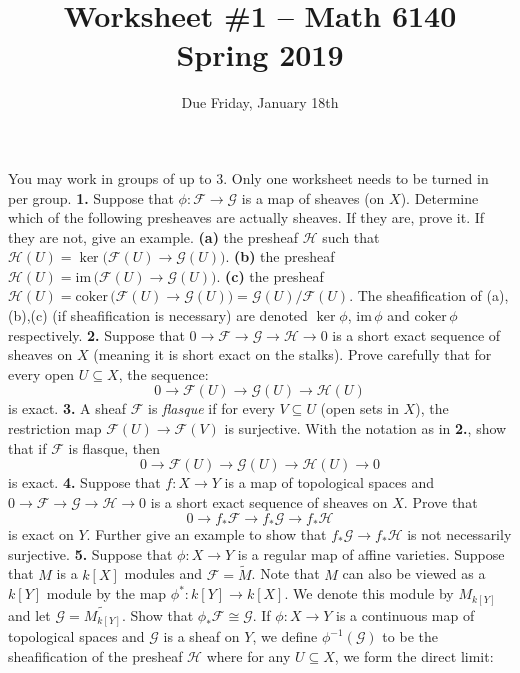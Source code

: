 \documentclass[11pt]{amsart}
\theoremstyle{theorem}
\renewcommand{\to}[1][]{\xrightarrow{\ #1\ }}
\newcommand{\cF}{\mathcal{F}}
\newcommand{\cG}{\mathcal{G}}
\newcommand{\cH}{\mathcal{H}}
\newcommand{\image}{\mathrm{im}\,}
\newcommand{\coker}{\mathrm{coker}\,}
\begin{document}
\title{Worksheet \#1 -- Math 6140\\Spring 2019}
\author{Due Friday, January 18th}

\maketitle
You may work in groups of up to 3.  Only one worksheet needs to be turned in per group.
\vskip 9pt
\noindent
{\bf 1.}  Suppose that $\phi : \cF \to \cG$ is a map of sheaves (on $X$).  Determine which of the following presheaves are actually sheaves.  If they are, prove it.  If they are not, give an example.
\vskip 3pt
{\bf (a)}  the presheaf $\cH$ such that $\cH(U) = \ker\big(\cF(U) \to \cG(U)\big)$.
\vskip 120pt
{\bf (b)}  the presheaf $\cH(U) = \image\big(\cF(U) \to \cG(U)\big)$.
\vskip 120pt
{\bf (c)}  the presheaf $\cH(U) = \coker\big(\cF(U) \to \cG(U)\big) = \cG(U)/\cF(U)$.
\vskip 120pt
\vfill
The sheafification of (a),(b),(c) (if sheafification is necessary) are denoted $\ker \phi$, $\image \phi$ and $\coker \phi$ respectively.
\newpage
\noindent
{\bf 2.}  Suppose that $0 \to \cF \to \cG \to \cH \to 0$ is a short exact sequence of sheaves on $X$ (meaning it is short exact on the stalks).  Prove carefully that for every open $U \subseteq X$, the sequence:
\[
0 \to \cF(U) \to \cG(U) \to \cH(U)
\]
is exact.
\vskip 160pt
\noindent
{\bf 3.}  A sheaf $\cF$ is \emph{flasque} if for every $V \subseteq U$ (open sets in $X$), the restriction map $\cF(U) \to \cF(V)$ is surjective.  With the notation as in {\bf 2.}, show that if $\cF$ is {flasque}, then
\[
0 \to \cF(U) \to \cG(U) \to \cH(U) \to 0
\]
is exact.
\vskip 160pt
\noindent
{\bf 4.}  Suppose that $f : X \to Y$ is a map of topological spaces and $0 \to \cF \to \cG \to  \cH \to 0$ is a short exact sequence of sheaves on $X$.  Prove that
\[
0 \to f_* \cF \to f_* \cG \to f_* \cH
\]
is exact on $Y$.  Further give an example to show that $f_* \cG \to f_* \cH$ is not necessarily surjective.
\newpage
\noindent
{\bf 5.}  Suppose that $\phi : X \to Y$ is a regular map of affine varieties.  Suppose that $M$ is a $k[X]$ modules and $\cF = \widetilde{M}$.  Note that $M$ can also be viewed as a $k[Y]$ module by the map $\phi^* : k[Y] \to k[X]$.  We denote this module by $M_{k[Y]}$ and let $\cG = \widetilde{M_{k[Y]}}$.  Show that $\phi_* \cF \cong \cG$.
\vskip 200pt
\noindent
If $\phi : X \to Y$ is a continuous map of topological spaces and $\cG$ is a sheaf on $Y$, we define $\phi^{-1}(\cG)$ to be the sheafification of the presheaf $\cH$ where for any $U \subseteq X$, we form the direct limit:
\end{document}

